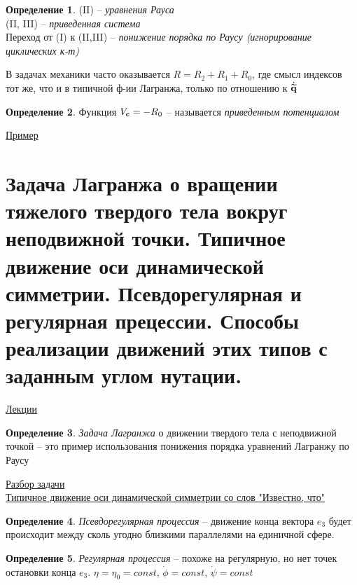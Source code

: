 \documentclass[specialist, subf, href, colorlinks=true, 12pt, times, mtpro, final]{disser}
\theoremstyle{definition}
\newtheorem{defn}{Определение}[section]
\begin{document}
    \begin{defn} 
    (II) \--- { \it уравнения Рауса}\\
    (II, III) \--- {\it приведенная система}\\
    Переход от (I)  к (II,III) \--- {\it понижение порядка по Раусу (игнорирование циклических к-т)}
    \end{defn}
    
    В задачах механики часто оказывается $R= R_2+R_1+R_0$, где смысл индексов тот же, что и в типичной ф-ии Лагранжа, только по отношению к $\dot{\widetilde{\mathbf{q}}}$
    
      \begin{defn} 
    Функция $V_{\mathbf{c}} = -R_0$ \--- называется {\it приведенным потенциалом}
    \end{defn}
    
    \noindent\hyperlink {lects.5}{Пример}\\
    
    
    \section{Задача Лагранжа о вращении тяжелого твердого тела вокруг неподвижной точки. Типичное движение оси динамической симметрии. Псевдорегулярная и регулярная прецессии. Способы реализации движений этих типов с заданным углом нутации.}
     \label{10}
    \hyperlink {lects.6}{Лекции} \\
    \begin{defn} 
    	{\it Задача Лагранжа} о движении твердого тела с неподвижной точкой \--- это пример использования понижения порядка уравнений Лагранжу по Раусу
    \end{defn}
     \noindent\hyperlink {lects.6}{Разбор задачи}\\
      \noindent\hyperlink {lects.7}{Типичное движение оси динамической симметрии со слов "Известно, что"}\\
    
    \begin{defn} 
    	{\it Псевдорегулярная процессия} \--- движение конца вектора $e_3$ будет происходит между сколь угодно близкими параллелями на единичной сфере.
    \end{defn}
    \begin{defn} 
    	{\it Регулярная процессия} \--- похоже на регулярную, но нет точек остановки конца $e_3$. $\eta = \eta_0=const$, $\dot{\phi}=const$, $\dot{\psi} = const$
    \end{defn}
    
\end{document}
